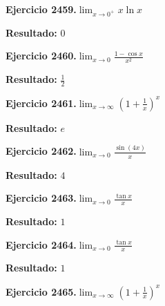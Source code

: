 \documentclass[10pt,a4paper]{article}
\begin{document}
\begin{ejbox}
\textbf{Ejercicio 2459.}\quad $\lim_{x\to 0^+} x\ln x$
\end{ejbox}

\begin{solbox}
\textbf{Resultado:} \(\displaystyle 0\)
\end{solbox}

\newpage
\begin{ejbox}
\textbf{Ejercicio 2460.}\quad $\lim_{x\to 0} \frac{1-\cos x}{x^2}$
\end{ejbox}

\begin{solbox}
\textbf{Resultado:} \(\displaystyle \frac{1}{2}\)
\end{solbox}

\begin{ejbox}
\textbf{Ejercicio 2461.}\quad $\lim_{x\to \infty} \left(1+\frac{1}{x}\right)^x$
\end{ejbox}

\begin{solbox}
\textbf{Resultado:} \(\displaystyle e\)
\end{solbox}

\begin{ejbox}
\textbf{Ejercicio 2462.}\quad $\lim_{x\to 0} \frac{\sin(4x)}{x}$
\end{ejbox}

\begin{solbox}
\textbf{Resultado:} \(\displaystyle 4\)
\end{solbox}

\newpage
\begin{ejbox}
\textbf{Ejercicio 2463.}\quad $\lim_{x\to 0} \frac{\tan x}{x}$
\end{ejbox}

\begin{solbox}
\textbf{Resultado:} \(\displaystyle 1\)
\end{solbox}

\begin{ejbox}
\textbf{Ejercicio 2464.}\quad $\lim_{x\to 0} \frac{\tan x}{x}$
\end{ejbox}

\begin{solbox}
\textbf{Resultado:} \(\displaystyle 1\)
\end{solbox}

\begin{ejbox}
\textbf{Ejercicio 2465.}\quad $\lim_{x\to \infty} \left(1+\frac{1}{x}\right)^x$
\end{ejbox}
\end{document}

